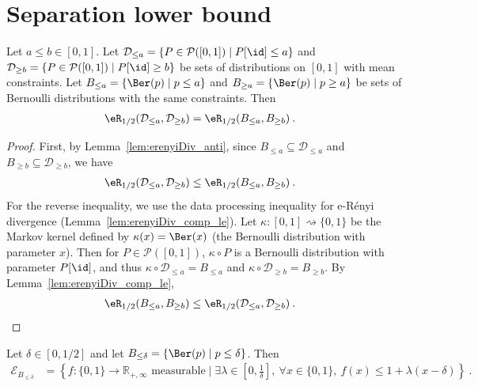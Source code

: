\section{Separation lower bound}
\label{sec:separation_lower_bound}


\begin{lemma}\label{lem:erenyiDiv_bounded_eq_erenyiDiv_bernoulli}
  \leanok
Let $a \le b \in [0,1]$.
Let $\mathcal{D}_{\le a} = \{P \in \mathcal{P}([0,1]) \mid P[\id] \le a\}$ and $\mathcal{D}_{\ge b} = \{P \in \mathcal{P}([0,1]) \mid P[\id] \ge b\}$ be sets of distributions on $[0,1]$ with mean constraints.
Let $B_{\le a} = \{\Ber(p) \mid p \le a\}$ and $B_{\ge a} = \{\Ber(p) \mid p \ge a\}$ be sets of Bernoulli distributions with the same constraints.
Then
\begin{align*}
  \eR_{1/2}(\mathcal{D}_{\le a}, \mathcal{D}_{\ge b})
  &= \eR_{1/2}(B_{\le a}, B_{\ge b})
  \: .
\end{align*}
\end{lemma}

\begin{proof}\leanok
First, by Lemma~\ref{lem:erenyiDiv_anti}, since $B_{\le a} \subseteq \mathcal{D}_{\le a}$ and $B_{\ge b} \subseteq \mathcal{D}_{\ge b}$, we have
\begin{align*}
  \eR_{1/2}(\mathcal{D}_{\le a}, \mathcal{D}_{\ge b})
  &\le \eR_{1/2}(B_{\le a}, B_{\ge b})
  \: .
\end{align*}
For the reverse inequality, we use the data processing inequality for e-Rényi divergence (Lemma~\ref{lem:erenyiDiv_comp_le}).
Let $\kappa : [0,1] \rightsquigarrow \{0,1\}$ be the Markov kernel defined by $\kappa(x) = \Ber(x)$ (the Bernoulli distribution with parameter $x$).
Then for $P \in \mathcal{P}([0, 1])$, $\kappa \circ P$ is a Bernoulli distribution with parameter $P[\id]$, and thus $\kappa \circ \mathcal{D}_{\le a} = B_{\le a}$ and $\kappa \circ \mathcal{D}_{\ge b} = B_{\ge b}$.
By Lemma~\ref{lem:erenyiDiv_comp_le},
\begin{align*}
  \eR_{1/2}(B_{\le a}, B_{\ge b})
  &\le \eR_{1/2}(\mathcal{D}_{\le a}, \mathcal{D}_{\ge b})
  \: .
\end{align*}
\end{proof}


\begin{lemma}\label{lem:eVarSet_bernoulli_le}
  \leanok
Let $\delta \in [0,1/2]$ and let $B_{\le \delta} = \{\Ber(p) \mid p \le \delta\}$.
Then
\begin{align*}
  \mathcal{E}_{B_{\le \delta}}
  &= \left\{f : \{0,1\} \to \mathbb{R}_{+, \infty} \text{ measurable} \mid \exists \lambda \in \left[0, \frac{1}{\delta}\right], \: \forall x \in \{0, 1\}, \: f(x) \le 1 + \lambda (x - \delta)\right\}
  \: .
\end{align*}
\end{lemma}

